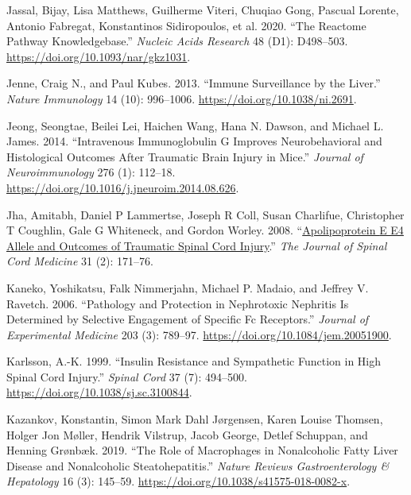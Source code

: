 \documentclass[9pt,lineno]{elife}
\newlength{\cslhangindent}
\newlength{\cslentryspacingunit} %
\newenvironment{CSLReferences}[2] %
 {%
  \setlength{\parindent}{0pt}
  \ifodd #1
  \let\oldpar\par
  \def\par{\hangindent=\cslhangindent\oldpar}
  \fi
  \setlength{\parskip}{#2\cslentryspacingunit}
 }%
 {}
\begin{document}
\begin{CSLReferences}{1}{0}
\leavevmode{}%
Jassal, Bijay, Lisa Matthews, Guilherme Viteri, Chuqiao Gong, Pascual Lorente, Antonio Fabregat, Konstantinos Sidiropoulos, et al. 2020. {``The Reactome Pathway Knowledgebase.''} \emph{Nucleic Acids Research} 48 (D1): D498--503. \url{https://doi.org/10.1093/nar/gkz1031}.

\leavevmode{}%
Jenne, Craig N., and Paul Kubes. 2013. {``Immune Surveillance by the Liver.''} \emph{Nature Immunology} 14 (10): 996--1006. \url{https://doi.org/10.1038/ni.2691}.

\leavevmode{}%
Jeong, Seongtae, Beilei Lei, Haichen Wang, Hana N. Dawson, and Michael L. James. 2014. {``Intravenous Immunoglobulin {G} Improves Neurobehavioral and Histological Outcomes After Traumatic Brain Injury in Mice.''} \emph{Journal of Neuroimmunology} 276 (1): 112--18. \url{https://doi.org/10.1016/j.jneuroim.2014.08.626}.

\leavevmode{}%
Jha, Amitabh, Daniel P Lammertse, Joseph R Coll, Susan Charlifue, Christopher T Coughlin, Gale G Whiteneck, and Gordon Worley. 2008. {``\href{https://www.ncbi.nlm.nih.gov/pmc/articles/PMC2565476}{Apolipoprotein {E E4 Allele} and {Outcomes} of {Traumatic Spinal Cord Injury}}.''} \emph{The Journal of Spinal Cord Medicine} 31 (2): 171--76.

\leavevmode{}%
Kaneko, Yoshikatsu, Falk Nimmerjahn, Michael P. Madaio, and Jeffrey V. Ravetch. 2006. {``Pathology and Protection in Nephrotoxic Nephritis Is Determined by Selective Engagement of Specific {Fc} Receptors.''} \emph{Journal of Experimental Medicine} 203 (3): 789--97. \url{https://doi.org/10.1084/jem.20051900}.

\leavevmode{}%
Karlsson, A.-K. 1999. {``Insulin Resistance and Sympathetic Function in High Spinal Cord Injury.''} \emph{Spinal Cord} 37 (7): 494--500. \url{https://doi.org/10.1038/sj.sc.3100844}.

\leavevmode{}%
Kazankov, Konstantin, Simon Mark Dahl Jørgensen, Karen Louise Thomsen, Holger Jon Møller, Hendrik Vilstrup, Jacob George, Detlef Schuppan, and Henning Grønbæk. 2019. {``The Role of Macrophages in Nonalcoholic Fatty Liver Disease and Nonalcoholic Steatohepatitis.''} \emph{Nature Reviews Gastroenterology \& Hepatology} 16 (3): 145--59. \url{https://doi.org/10.1038/s41575-018-0082-x}.


\end{CSLReferences}
\end{document}

